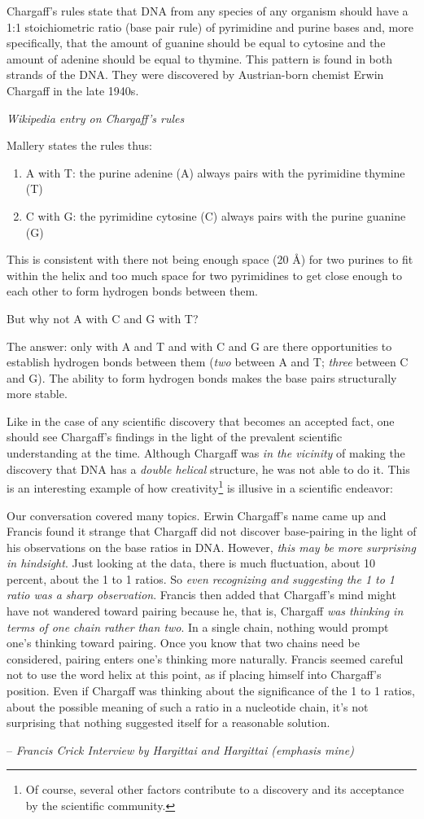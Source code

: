 \documentclass[12pt]{article}
\begin{document}
\epigraph{
    Chargaff's rules state that DNA from any species of any organism should have a 1:1 stoichiometric ratio (base pair rule) of pyrimidine and purine bases and, more specifically, that the amount of guanine should be equal to cytosine and the amount of adenine should be equal to thymine. This pattern is found in both strands of the DNA. They were discovered by Austrian-born chemist Erwin Chargaff in the late 1940s.
}{
    \textit{Wikipedia entry on Chargaff's rules}
}

Mallery \cite{mallery} states the rules thus:
\begin{enumerate}
    \item A with T: the purine adenine (A) always pairs with the pyrimidine thymine (T)
    \item C with G:  the pyrimidine cytosine (C) always pairs with the purine guanine (G)
\end{enumerate}

This is consistent with there not being enough space (20 \si{\angstrom}) for two purines to fit within the helix and too much space for two pyrimidines to get close enough to each other to form hydrogen bonds between them.

But why not A with C and G with T?

The answer: only with A and T and with C and G are there opportunities to establish hydrogen bonds between them (\emph{two} between A and T; \emph{three} between C and G). The ability to form hydrogen bonds makes the base pairs structurally more stable.

Like in the case of any scientific discovery that becomes an accepted fact, one should see Chargaff's findings in the light of the prevalent scientific understanding at the time. Although Chargaff was \emph{in the vicinity} of making the discovery that DNA has a \emph{double helical} structure, he was not able to do it. This is an interesting example of how creativity\footnote{Of course, several other factors contribute to a discovery and its acceptance by the scientific community.} is illusive in a scientific endeavor: 
\epigraph{
    Our conversation covered many topics. Erwin Chargaff's name came
up and Francis found it strange that Chargaff did not discover base-pairing
in the light of his observations on the base ratios in DNA. However, \emph{this may be more surprising in hindsight}. Just looking at the data, there is much fluctuation, about 10 percent, about the 1 to 1 ratios. So \emph{even recognizing and suggesting the 1 to 1 ratio was a sharp observation}. Francis then added that Chargaff's mind might have not wandered toward pairing
because he, that is, Chargaff \emph{was thinking in terms of one chain rather than two}. In a single chain, nothing would prompt one's thinking toward pairing. Once you know that two chains need be considered, pairing enters
one's thinking more naturally. Francis seemed careful not to use the word
helix at this point, as if placing himself into Chargaff's position. Even if Chargaff was thinking about the significance of the 1 to 1 ratios, about
the possible meaning of such a ratio in a nucleotide chain, it's not surprising that nothing suggested itself for a reasonable solution.
}
{
    -- \textit{Francis Crick Interview by Hargittai and Hargittai \cite{ih-mh} (emphasis mine)}
}
\end{document}
